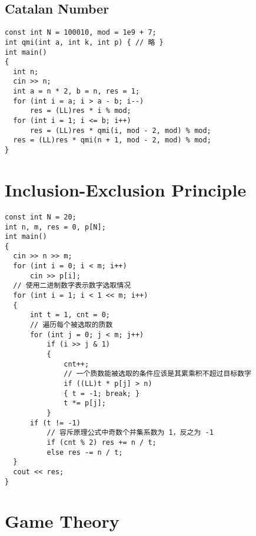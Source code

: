 \subsection{Catalan Number}
\begin{lstlisting}
const int N = 100010, mod = 1e9 + 7;
int qmi(int a, int k, int p) { // 略 }
int main()
{
  int n;
  cin >> n;
  int a = n * 2, b = n, res = 1;
  for (int i = a; i > a - b; i--)
      res = (LL)res * i % mod;
  for (int i = 1; i <= b; i++)
      res = (LL)res * qmi(i, mod - 2, mod) % mod;
  res = (LL)res * qmi(n + 1, mod - 2, mod) % mod;
}
\end{lstlisting}
\section{Inclusion-Exclusion Principle}
\begin{lstlisting}
const int N = 20;
int n, m, res = 0, p[N];
int main()
{
  cin >> n >> m;
  for (int i = 0; i < m; i++)
      cin >> p[i];
  // 使用二进制数字表示数字选取情况
  for (int i = 1; i < 1 << m; i++)
  {
      int t = 1, cnt = 0;
      // 遍历每个被选取的质数
      for (int j = 0; j < m; j++)
          if (i >> j & 1)
          {
              cnt++;
              // 一个质数能被选取的条件应该是其累乘积不超过目标数字
              if ((LL)t * p[j] > n)
              { t = -1; break; }
              t *= p[j];
          }
      if (t != -1)
          // 容斥原理公式中奇数个并集系数为 1，反之为 -1
          if (cnt % 2) res += n / t;
          else res -= n / t;
  }
  cout << res;
}
\end{lstlisting}
\section{Game Theory}
